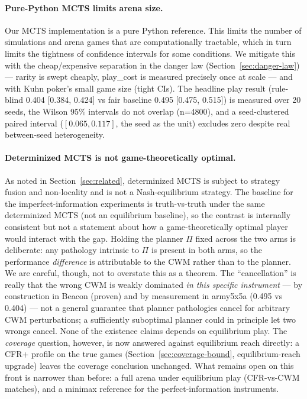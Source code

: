 \documentclass[11pt]{article}
\theoremstyle{remark}
\begin{document}
\paragraph{Pure-Python MCTS limits arena size.} Our MCTS implementation is a pure Python reference. This limits the number of simulations and arena games that are computationally tractable, which in turn limits the tightness of confidence intervals for some conditions. We mitigate this with the cheap/expensive separation in the danger law (Section~\ref{sec:danger-law}) --- rarity is swept cheaply, play\_cost is measured precisely once at scale --- and with Kuhn poker's small game size (tight CIs). The headline play result (rule-blind 0.404 [0.384, 0.424] vs fair baseline 0.495 [0.475, 0.515]) is measured over 20 seeds, the Wilson 95\% intervals do not overlap (n=4800), and a seed-clustered paired interval ($[0.065, 0.117]$, the seed as the unit) excludes zero despite real between-seed heterogeneity.

\paragraph{Determinized MCTS is not game-theoretically optimal.} As noted in Section~\ref{sec:related}, determinized MCTS is subject to strategy fusion and non-locality and is not a Nash-equilibrium strategy. The baseline for the imperfect-information experiments is truth-vs-truth under the same determinized MCTS (not an equilibrium baseline), so the contrast is internally consistent but not a statement about how a game-theoretically optimal player would interact with the gap. Holding the planner $\Pi$ fixed across the two arms is deliberate: any pathology intrinsic to $\Pi$ is present in both arms, so the performance \emph{difference} is attributable to the CWM rather than to the planner. We are careful, though, not to overstate this as a theorem. The ``cancellation'' is really that the wrong CWM is weakly dominated \emph{in this specific instrument} --- by construction in Beacon (proven) and by measurement in army5x5a (0.495 vs 0.404) --- not a general guarantee that planner pathologies cancel for arbitrary CWM perturbations; a sufficiently suboptimal planner could in principle let two wrongs cancel. None of the existence claims depends on equilibrium play. The \emph{coverage} question, however, is now answered against equilibrium reach directly: a CFR+ profile on the true games (Section~\ref{sec:coverage-bound}, equilibrium-reach upgrade) leaves the coverage conclusion unchanged. What remains open on this front is narrower than before: a full arena under equilibrium play (CFR-vs-CWM matches), and a minimax reference for the perfect-information instruments.
\end{document}
